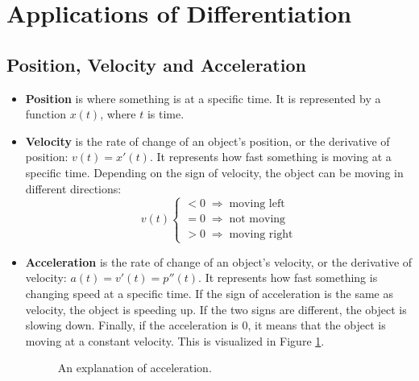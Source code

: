 \section{Applications of Differentiation}

\subsection{Position, Velocity and Acceleration}
\begin{itemize}
	\item \textbf{Position} is where something is at a specific time. It is represented by a function $x(t)$, where $t$ is time.

	\item \textbf{Velocity} is the rate of change of an object's position, or the derivative of position: $v(t) = x'(t)$. It represents how fast something is moving at a specific time. Depending on the sign of velocity, the object can be moving in different directions:
	\[ v(t) \begin{cases}
		< 0 \; \Rightarrow \; \text{moving left} \\
		= 0 \; \Rightarrow \; \text{not moving} \\
		> 0 \; \Rightarrow \; \text{moving right}
	\end{cases} \]

	\item \textbf{Acceleration} is the rate of change of an object's velocity, or the derivative of velocity: $a(t) = v'(t) = p''(t)$. It represents how fast something is changing speed at a specific time. If the sign of acceleration is the same as velocity, the object is speeding up. If the two signs are different, the object is slowing down. Finally, if the acceleration is $0$, it means that the object is moving at a constant velocity. This is visualized in Figure \ref{fig:acceleration}.
	\begin{figure}[H]
		\begin{center}
			\caption{An explanation of acceleration.}
			\label{fig:acceleration}
		\end{center}
	\end{figure}
\end{itemize}

